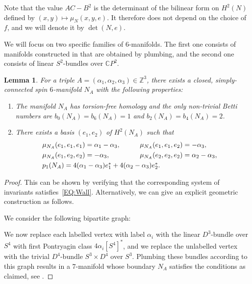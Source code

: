 \documentclass[10pt,a4paper]{amsart}
\numberwithin{equation}{section}
\newtheorem{Lemma}[Theorem]{Lemma}
\theoremstyle{definition}
\numberwithin{table}{section}
\newcommand{\Z}{\mathbb{Z}}
\newcommand{\C}{\mathbb{C}}
\begin{document}
Note that the value $AC-B^2$ is the determinant of the bilinear form on $H^2(N)$ defined by $(x,y)\mapsto \mu_N(x,y,e)$. It therefore does not depend on the choice of $f$, and we will denote it by $\det(N,e)$.

We will focus on two specific families of $6$-manifolds. The first one consists of manifolds constructed in \cite{Re24b} that are obtained by plumbing, and the second one consists of linear $S^2$-bundles over $\C P^2$.

\begin{Lemma}\label{L:N_A}
	For a triple $A=(\alpha_1,\alpha_2,\alpha_3)\in\Z^3$, there exists a closed, simply-connected spin $6$-manifold $N_A$ with the following properties:
	\begin{enumerate}\itemsep=0pt
		\item[$(1)$] The manifold $N_A$ has torsion-free homology and the only non-trivial Betti numbers are $b_0(N_A)=b_6(N_A)\allowbreak=1$ and $b_2(N_A)=b_4(N_A)=2$.
		\item[$(2)$] There exists a basis $(e_1,e_2)$ of $H^2(N_A)$ such that
		\begin{alignat*}{3}
			&\mu_{N_A}(e_1,e_1,e_1)=\alpha_1-\alpha_3,\qquad&&
			\mu_{N_A}(e_1,e_1,e_2)=-\alpha_3,&\\
			&\mu_{N_A}(e_1,e_2,e_2)=-\alpha_3,\qquad&&
			\mu_{N_A}(e_2,e_2,e_2)=\alpha_2-\alpha_3,&\\
			&\makebox[0pt][l]{$p_1(N_A)=4(\alpha_1-\alpha_3)e_1^*+4(\alpha_2-\alpha_3)e_2^*.$}&
		\end{alignat*}
	\end{enumerate}
\end{Lemma}
\begin{proof}
	This can be shown by verifying that the corresponding system of invariants satisfies~\eqref{EQ:Wall}. Alternatively, we can give an explicit geometric construction as follows.
	
	We consider the following bipartite graph:
	\begin{center}
	\end{center}
	We now replace each labelled vertex with label $\alpha_i$ with the linear $D^3$-bundle over $S^4$ with first Pontryagin class $4\alpha_i[S^4]^*$, and we replace the unlabelled vertex with the trivial $D^4$-bundle $S^3\times D^4$ over $S^3$. Plumbing these bundles according to this graph results in a $7$-manifold whose boundary $N_A$ satisfies the conditions as claimed, see \cite[Lemma~4.6 and Proposition 4.12]{Re24b}.
\end{proof}
\end{document}
